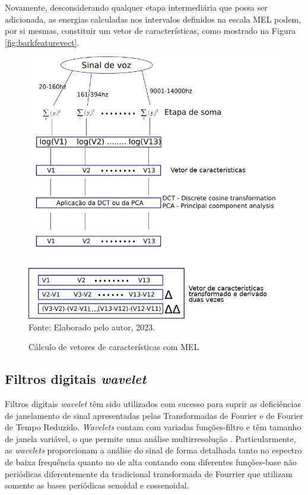 			\par Novamente, desconsiderando qualquer etapa intermediária que possa ser adicionada, as energias calculadas nos intervalos definidos na escala MEL podem, por si mesmas, constituir um vetor de características, como mostrado na Figura \ref{fig:barkfeaturevect}.
			
			\begin{figure}[h]
				\centering
				\caption{Cálculo de vetores de características com MEL}
				\includegraphics[width=0.8\linewidth]{images/melFeatureVect}
				\label{fig:melfeaturevect}
				\\Fonte: Elaborado pelo autor, 2023.
			\end{figure}
	
		\subsection{Filtros digitais \textit{wavelet}}
			\par Filtros digitais \textit{wavelet} têm sido utilizados com sucesso para suprir as deficiências de janelamento de sinal apresentadas pelas Transformadas de Fourier e de Fourier de Tempo Reduzido. \textit{Wavelets} contam com variadas funções-filtro e têm tamanho de janela variável, o que permite uma análise multirresolução \cite{Rod5254905}. Particularmente, as \textit{wavelets} proporcionam a análise do sinal de forma detalhada tanto no espectro de baixa frequência quanto no de alta contando com diferentes funções-base não periódicas diferentemente da tradicional transformada de Fourrier que utilizam somente as bases periódicas senoidal e cossenoidal.
			
